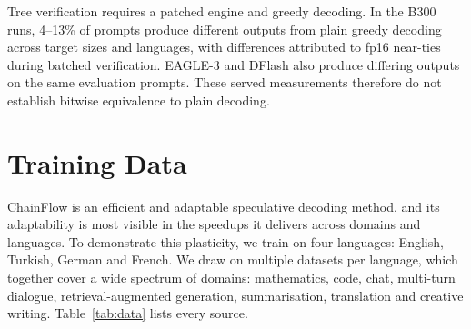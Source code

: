 \documentclass{article}
\begin{document}
Tree verification requires a patched engine and greedy decoding. In the
B300 runs, 4--13\% of prompts produce different outputs from plain greedy
decoding across target sizes and languages, with differences attributed
to fp16 near-ties during batched verification. EAGLE-3 and DFlash also
produce differing outputs on the same evaluation prompts. These served
measurements therefore do not establish bitwise equivalence to plain
decoding.




\clearpage
\onecolumn
\appendix

\section{Training Data}
\label{sec:appendix-data}

ChainFlow is an efficient and adaptable speculative decoding method, and its adaptability is most visible in the speedups it delivers across domains and languages. To demonstrate this plasticity, we train on four languages: English, Turkish, German and French. We draw on multiple datasets per language, which together cover a wide spectrum of domains: mathematics, code, chat, multi-turn dialogue, retrieval-augmented generation, summarisation, translation and creative writing. Table~\ref{tab:data} lists every source.
\end{document}
